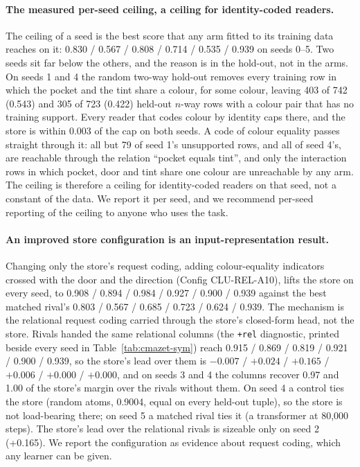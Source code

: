\documentclass{article} %
\begin{document}
\paragraph{The measured per-seed ceiling, a ceiling for identity-coded readers.} The ceiling of a
seed is the best score that any arm fitted to its training data reaches on it: 0.830 / 0.567 / 0.808
/ 0.714 / 0.535 / 0.939 on seeds 0--5. Two seeds sit far below the others, and the reason is in the
hold-out, not in the arms. On seeds 1 and 4 the random two-way hold-out removes every training row in
which the pocket and the tint share a colour, for some colour, leaving 403 of 742 (0.543) and 305 of
723 (0.422) held-out $n$-way rows with a colour pair that has no training support. Every reader that
codes colour by identity caps there, and the store is within 0.003 of the cap on both seeds. A code of
colour equality passes straight through it: all but 79 of seed 1's unsupported rows, and all of seed
4's, are reachable through the relation ``pocket equals tint'', and only the interaction rows in which
pocket, door and tint share one colour are unreachable by any arm. The ceiling is therefore a ceiling
for identity-coded readers on that seed, not a constant of the data. We report it per seed, and we
recommend per-seed reporting of the ceiling to anyone who uses the task.

\paragraph{An improved store configuration is an input-representation result.} Changing only the
store's request coding, adding colour-equality indicators crossed with the door and the direction
(Config CLU-REL-A10), lifts the store on every seed, to 0.908 / 0.894 / 0.984 / 0.927 / 0.900 / 0.939
against the best matched rival's 0.803 / 0.567 / 0.685 / 0.723 / 0.624 / 0.939. The mechanism is the
relational request coding carried through the store's closed-form head, not the store. Rivals handed
the same relational columns (the \texttt{+rel} diagnostic, printed beside every seed in
Table~\ref{tab:cmazet-sym}) reach 0.915 / 0.869 / 0.819 / 0.921 / 0.900 / 0.939, so the store's lead
over them is $-0.007$ / $+0.024$ / $+0.165$ / $+0.006$ / $+0.000$ / $+0.000$, and on seeds 3 and 4 the
columns recover 0.97 and 1.00 of the store's margin over the rivals without them. On seed 4 a control
ties the store (random atoms, 0.9004, equal on every held-out tuple), so the store is not load-bearing
there; on seed 5 a matched rival ties it (a transformer at 80,000 steps). The store's lead over the
relational rivals is sizeable only on seed 2 (+0.165). We report the configuration as evidence about
request coding, which any learner can be given.
\end{document}
